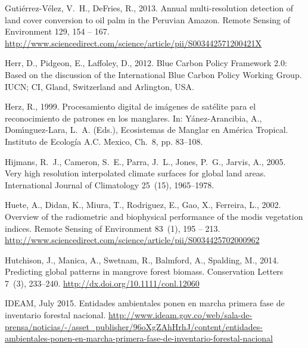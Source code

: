 \documentclass[review, authoryear]{elsarticle}   	%
\begin{document}
\begin{thebibliography}{51}
Guti{\'e}rrez-V{\'e}lez, V.~H., DeFries, R., 2013. Annual multi-resolution
  detection of land cover conversion to oil palm in the {Peruvian Amazon}.
  Remote Sensing of Environment 129, 154 -- 167.
\newline\urlprefix\url{http://www.sciencedirect.com/science/article/pii/S003442571200421X}

Herr, D., Pidgeon, E., Laffoley, D., 2012. {Blue Carbon Policy Framework 2.0:
  Based on the discussion of the International Blue Carbon Policy Working
  Group}. IUCN; CI, Gland, Switzerland and Arlington, USA.

Herz, R., 1999. {Procesamiento digital de im{\'a}genes de sat{\'e}lite para el
  reconocimiento de patrones en los manglares}. In: Y{\'a}nez-Arancibia, A.,
  Dom{\'\i}nguez-Lara, L.~A. (Eds.), Ecosistemas de Manglar en Am{\'e}rica
  Tropical. Instituto de Ecolog\'{i}a A.C. Mexico, Ch.~8, pp. 83--108.

Hijmans, R.~J., Cameron, S.~E., Parra, J.~L., Jones, P.~G., Jarvis, A., 2005.
  {Very high resolution interpolated climate surfaces for global land areas}.
  International Journal of Climatology 25~(15), 1965--1978.

Huete, A., Didan, K., Miura, T., Rodriguez, E., Gao, X., Ferreira, L., 2002.
  Overview of the radiometric and biophysical performance of the modis
  vegetation indices. Remote Sensing of Environment 83~(1), 195 -- 213.
\newline\urlprefix\url{http://www.sciencedirect.com/science/article/pii/S0034425702000962}

Hutchison, J., Manica, A., Swetnam, R., Balmford, A., Spalding, M., 2014.
  Predicting global patterns in mangrove forest biomass. Conservation Letters
  7~(3), 233--240.
\newline\urlprefix\url{http://dx.doi.org/10.1111/conl.12060}

IDEAM, July 2015. Entidades ambientales ponen en marcha primera fase de
  inventario forestal nacional.
\newline\urlprefix\url{http://www.ideam.gov.co/web/sala-de-prensa/noticias/-/asset_publisher/96oXgZAhHrhJ/content/entidades-ambientales-ponen-en-marcha-primera-fase-de-inventario-forestal-nacional}


\end{thebibliography}
\end{document}
